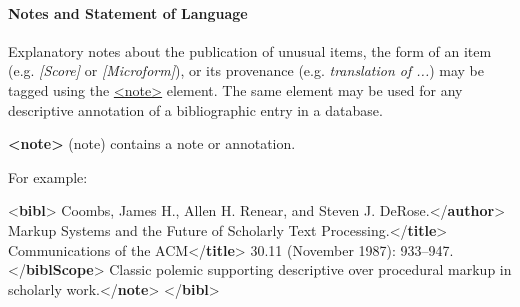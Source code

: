 \paragraph[{Notes and Statement of Language}]{Notes and Statement of Language}\label{COBICON}\par
Explanatory notes about the publication of unusual items, the form of an item (e.g. \textit{[Score]} or \textit{[Microform]}), or its provenance (e.g. \textit{translation of ...}) may be tagged using the \hyperref[TEI.note]{<note>} element. The same element may be used for any descriptive annotation of a bibliographic entry in a database. 
\begin{sansreflist}
  
\item [\textbf{<note>}] (note) contains a note or annotation.
\end{sansreflist}
\par
For example: \par\bgroup{}\exampleFont \begin{shaded}\noindent\mbox{}{<\textbf{bibl}>}\mbox{}\newline 
{}Coombs, James H., Allen H. Renear,\mbox{}\newline 
\hspace*{1em}\hspace*{1em} and Steven J. DeRose.{</\textbf{author}>}\mbox{}\newline 
{}Markup Systems and the Future of Scholarly\mbox{}\newline 
\hspace*{1em}\hspace*{1em} Text Processing.{</\textbf{title}>}\mbox{}\newline 
{}Communications of the ACM{</\textbf{title}>}\mbox{}\newline 
{}30.11 (November 1987): 933–947.{</\textbf{biblScope}>}\mbox{}\newline 
{}Classic polemic supporting descriptive over procedural\mbox{}\newline 
\hspace*{1em}\hspace*{1em} markup in scholarly work.{</\textbf{note}>}\mbox{}\newline 
{</\textbf{bibl}>}\end{shaded}\egroup\par \par
